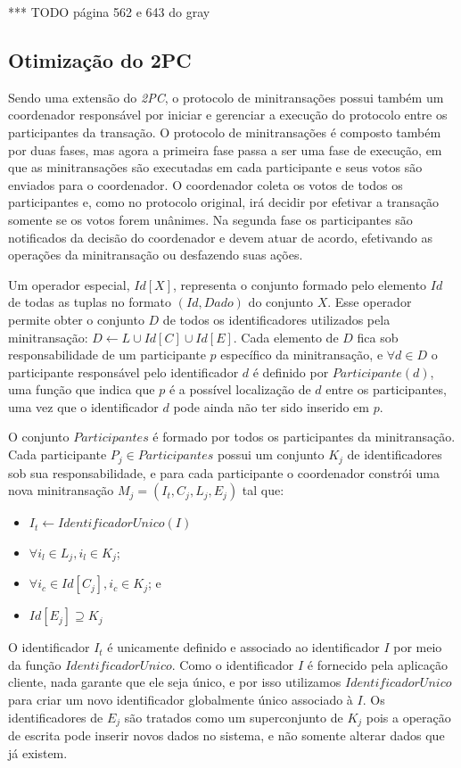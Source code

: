 \documentclass[11pt,twoside,a4paper]{book}
\begin{document}
*** TODO página 562 e 643 do gray 

\subsection{Otimização do 2PC}
\label{subsec:otimizacao_2pc}
Sendo uma extensão do \emph{2PC}, o protocolo de minitransações possui também um coordenador responsável por iniciar e gerenciar a execução do protocolo entre os participantes da transação. O protocolo de minitransações é composto também por duas fases, mas agora a primeira fase passa a ser uma fase de execução, em que as minitransações são executadas em cada participante e seus votos são enviados para o coordenador. O coordenador coleta os votos de todos os participantes e, como no protocolo original, irá decidir por efetivar a transação somente se os votos forem unânimes. Na segunda fase os participantes são notificados da decisão do coordenador e devem atuar de acordo, efetivando as operações da minitransação ou desfazendo suas ações.

Um operador especial, $Id[X]$, representa o conjunto formado pelo elemento $Id$ de todas as tuplas no formato $(Id, Dado)$ do conjunto $X$. Esse operador permite obter o conjunto $D$ de todos os identificadores utilizados pela minitransação: $D \gets L \cup Id[C] \cup Id[E]$. Cada elemento de $D$ fica sob responsabilidade de um participante $p$ específico da minitransação, e $\forall d \in D$ o participante responsável pelo identificador $d$ é definido por $Participante(d)$, uma função que indica que $p$ é a possível localização de $d$ entre os participantes, uma vez que o identificador $d$ pode ainda não ter sido inserido em $p$.

O conjunto $Participantes$ é formado por todos os participantes da minitransação. Cada participante $P_j \in Participantes$ possui um conjunto $K_j$ de identificadores sob sua responsabilidade, e para cada participante o coordenador constrói uma nova minitransação \(M_j = (I_t, C_j, L_j, E_j)\) tal que:

\begin{itemize}
    \item $I_t \gets IdentificadorUnico(I)$
    \item $\forall i_l \in L_j, i_l \in K_j$;
    \item $\forall i_c \in Id[C_j], i_c \in K_j$; e
    \item $Id[E_j] \supseteq K_j$
\end{itemize}

O identificador $I_t$ é unicamente definido e associado ao identificador $I$ por meio da função $IdentificadorUnico$. Como o identificador $I$ é fornecido pela aplicação cliente, nada garante que ele seja único, e por isso utilizamos $IdentificadorUnico$ para criar um novo identificador globalmente único associado à $I$. Os identificadores de $E_j$ são tratados como um superconjunto de $K_j$ pois a operação de escrita pode inserir novos dados no sistema, e não somente alterar dados que já existem.
\end{document}
